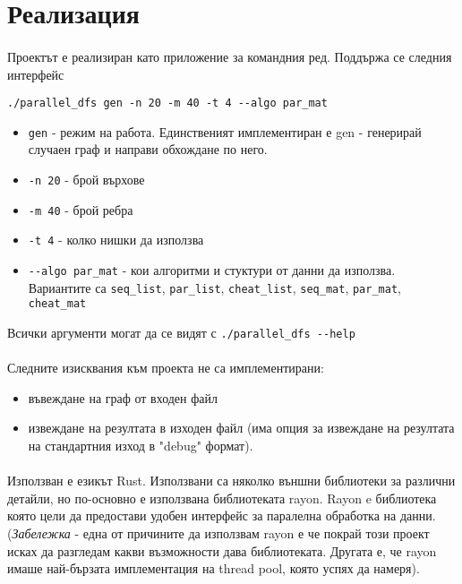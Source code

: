 \section{Реализация}

\paragraph*{} Проектът е реализиран като приложение за командния ред. Поддържа се следния интерфейс

\verb|./parallel_dfs gen -n 20 -m 40 -t 4 --algo par_mat|

\begin{itemize}
\item \verb|gen| - режим на работа. Единственият имплементиран е gen - генерирай случаен граф и направи обхождане по него.
\item \verb|-n 20| - брой върхове
\item \verb|-m 40| - брой ребра
\item \verb|-t 4| - колко нишки да използва
\item \verb|--algo par_mat| - кои алгоритми и стуктури от данни да използва. Вариантите са \verb|seq_list|, \verb|par_list|, \verb|cheat_list|, \verb|seq_mat|, \verb|par_mat|, \verb|cheat_mat|
\end{itemize}

Всички аргументи могат да се видят с \verb|./parallel_dfs --help|

\paragraph*{} Следните изисквания към проекта не са имплементирани:
\begin{itemize}
\item въвеждане на граф от входен файл
\item извеждане на резултата в изходен файл (има опция за извеждане на резултата на стандартния изход в "debug" формат).
\end{itemize}

\paragraph*{} Използван е езикът Rust. Използвани са няколко външни библиотеки за различни детайли, но по-основно е използвана библиотеката rayon. Rayon e библиотека която цели да предостави удобен интерфейс за паралелна обработка на данни. (\textit{Забележка} - една от причините да използвам rayon е че покрай този проект исках да разгледам какви възможности дава библиотеката. Другата е, че rayon имаше най-бързата имплементация на thread pool, която успях да намеря).

